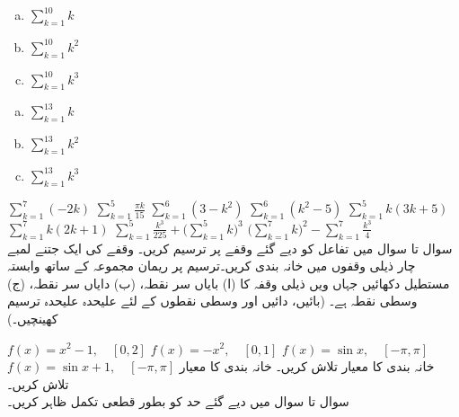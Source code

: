 \begin{multicols}{3}
\begin{enumerate}[a.]
\item
$\sum\limits_{k=1}^{10} k$
\item
$\sum\limits_{k=1}^{10}k^2$
\item
$\sum\limits_{k=1}^{10}k^3$
\end{enumerate}
\end{multicols}
\begin{multicols}{3}
\begin{enumerate}[a.]
\item
$\sum\limits_{k=1}^{13} k$
\item
$\sum\limits_{k=1}^{13}k^2$
\item
$\sum\limits_{k=1}^{13}k^3$
\end{enumerate}
\end{multicols}
$\sum\limits_{k=1}^7 (-2k)$
$\sum\limits_{k=1}^5 \tfrac{\pi k}{15}$
$\sum\limits_{k=1}^6 (3-k^2)$
$\sum\limits_{k=1}^6 (k^2-5)$
$\sum\limits_{k=1}^5 k(3k+5)$
$\sum\limits_{k=1}^7 k(2k+1)$
$\sum\limits_{k=1}^5 \tfrac{k^3}{225}+\big(\sum\limits_{k=1}^5 k\big)^3$
$\big(\sum\limits_{k=1}^7 k\big)^2-\sum\limits_{k=1}^7 \tfrac{k^3}{4}$
\\
سوال  تا سوال  میں تفاعل  کو دیے گئے وقفے پر ترسیم کریں۔ وقفے کی ایک جتنے لمبے چار ذیلی وقفوں میں خانہ بندی کریں۔ترسیم پر ریمان مجموعہ  کے ساتھ وابستہ مستطیل دکھائیں جہاں  ویں  ذیلی وقفہ کا  (ا) بایاں سر نقطہ، (ب) دایاں سر نقطہ، (ج) وسطی نقطہ   ہے۔ (بائیں، دائیں اور وسطی نقطوں کے لئے علیحدہ علیحدہ ترسیم کھینچیں۔)

$f(x)=x^2-1,\quad [0,2]$
$f(x)=-x^2,\quad [0,1]$
$f(x)=\sin x,\quad [-\pi,\pi]$
$f(x)=\sin x+1,\quad [-\pi,\pi]$
خانہ بندی  کا معیار تلاش کریں۔
خانہ بندی  کا معیار تلاش کریں۔
\\
سوال  تا سوال  میں دیے گئے حد کو بطور قطعی تکمل ظاہر کریں۔

